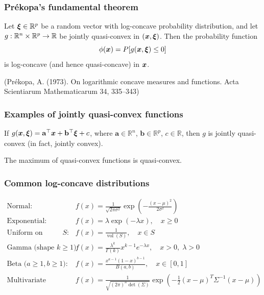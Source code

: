 \documentclass[aspectratio=169]{beamer}
\begin{document}
\begin{frame}
\frametitle{Prékopa's fundamental theorem}

\begin{theorem}
Let ${\boldsymbol{\xi}} \in {\mathbb{R}}^p$ be a random vector with log-concave probability distribution, and let $g: {\mathbb{R}}^n \times {\mathbb{R}}^p \to {\mathbb{R}}$ be jointly quasi-convex in $({\boldsymbol{x}}, {\boldsymbol{\xi}})$. Then the probability function
\[
	\phi({\boldsymbol{x}}) = P[ g({\boldsymbol{x}}, {\boldsymbol{\xi}}) \leq 0 ]
\]
is log-concave (and hence quasi-concave) in ${\boldsymbol{x}}$.
\end{theorem}

\mbox{}

(Prékopa, A. (1973). On logarithmic concave measures and functions.
Acta Scientiarum Mathematicarum 34, 335--343)
\end{frame}

\begin{frame}
\frametitle{Examples of jointly quasi-convex functions}

\begin{example}
	If $g({\boldsymbol{x}}, {\boldsymbol{\xi}}) = \mathbf{a}^\top {\boldsymbol{x}} + \mathbf{b}^\top {\boldsymbol{\xi}} + c$, where $\mathbf{a} \in \mathbb{R}^n$, $\mathbf{b} \in \mathbb{R}^p$, $c \in \mathbb{R}$, then $g$ is jointly quasi-convex (in fact, jointly convex).
\end{example}

\begin{example}[Maximum]
The maximum of quasi-convex functions is quasi-convex.
\end{example}

\end{frame}

\begin{frame}
\frametitle{Common log-concave distributions}

{\small
\begin{align*}
	\text{Normal:} &\quad f(x) = \frac{1}{\sqrt{2\pi\sigma^2}} \exp\left(-\frac{(x-\mu)^2}{2\sigma^2}\right) \\
	\text{Exponential:} &\quad f(x) = \lambda \exp(-\lambda x), \quad x \geq 0 \\
	\text{Uniform on convex } S: &\quad f(x) = \frac{1}{\operatorname{vol}(S)}, \quad x \in S \\
	\text{Gamma (shape $k \geq 1$):} &\quad f(x) = \frac{\lambda^k}{\Gamma(k)} x^{k-1} e^{-\lambda x}, \quad x > 0, \; \lambda > 0 \\
	\text{Beta ($a \geq 1, b \geq 1$):} &\quad f(x) = \frac{x^{a-1}(1-x)^{b-1}}{B(a,b)}, \quad x \in [0,1]\\
	\text{Multivariate normal:} &\quad f(x) = \frac{1}{\sqrt{(2\pi)^n \det(\Sigma)}} \exp\left( -\frac{1}{2}(x-\mu)^T \Sigma^{-1} (x-\mu) \right)
\end{align*}
}

\end{frame}
\end{document}
